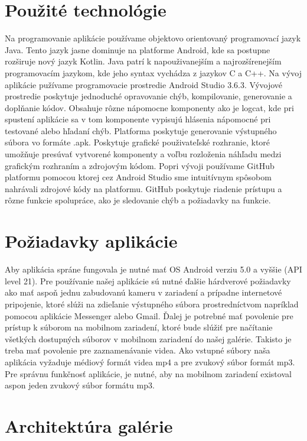 \documentclass[12pt, oneside]{book}
\begin{document}
\section{Použité technológie}

\hspace{15pt} Na programovanie aplikácie používame objektovo orientovaný programovací jazyk Java. Tento jazyk jasne dominuje na platforme Android, kde sa postupne rozširuje nový jazyk Kotlin. Java patrí k napouživanejším a najrozšírenejším programovacím jazykom, kde jeho syntax vychádza z jazykov C a C++. Na vývoj aplikácie pužívame programovacie prostredie Android Studio 3.6.3. Vývojové prostredie poskytuje jednoduché opravovanie chýb, kompilovanie, generovanie a doplňanie kódov. Obsahuje rôzne nápomocne komponenty ako je logcat, kde pri spustení aplikácie sa v tom komponente vypisujú hlásenia nápomocné pri testované alebo hľadaní chýb. Platforma poskytuje generovanie výstupného súbora vo formáte .apk. Poskytuje grafické použivateľské rozhranie, ktoré umožňuje presúvať vytvorené komponenty a voľbu rozloženia náhľadu medzi grafickým rozhraním a zdrojovým kódom. Popri vývoji používame GitHub platformu pomocou ktorej cez Android Studio sme intuitívnym spôsobom nahrávali zdrojové kódy na platformu. GitHub poskytuje riadenie prístupu a rôzne funkcie spolupráce, ako je sledovanie chýb a požiadavky na funkcie. 

\section{Požiadavky aplikácie}

\hspace{15pt} Aby aplikácia spráne fungovala je nutné mať OS Android verziu 5.0 a vyššie (API level 21). Pre používanie našej aplikácie sú nutné ďalšie hárdverové požiadavky ako mať aspoň jednu zabudovanú kameru v zariadení a prípadne internetové pripojenie, ktoré slúži na zdieľanie výstupného súbora prostredníctvom napríklad pomocou aplikácie Messenger alebo Gmail. Ďalej je potrebné mať povolenie pre prístup k súborom na mobilnom zariadení, ktoré bude slúžiť pre načítanie všetkých dostupných súborov v mobilnom zariadení do našej galérie. Takisto je treba mať povolenie pre zaznamenávanie videa. Ako vstupné súbory naša aplikácia vyžaduje médiový formát videa mp4 a pre zvukový súbor formát mp3. Pre správnu funkčnosť aplikácie, je nutné, aby na mobilnom zariadení existoval aspon jeden zvukový súbor formátu mp3.  


\section{Architektúra galérie}
\label{sec:gallery}
\end{document}
